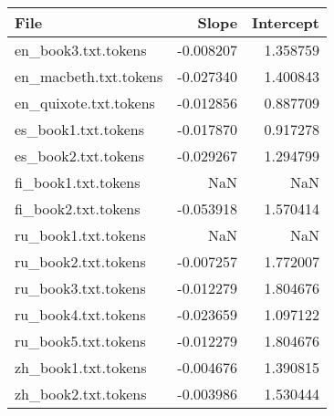 \begin{tabular}{lrr}
\toprule
File & Slope & Intercept \\
\midrule
en_book3.txt.tokens & -0.008207 & 1.358759 \\
en_macbeth.txt.tokens & -0.027340 & 1.400843 \\
en_quixote.txt.tokens & -0.012856 & 0.887709 \\
es_book1.txt.tokens & -0.017870 & 0.917278 \\
es_book2.txt.tokens & -0.029267 & 1.294799 \\
fi_book1.txt.tokens & NaN & NaN \\
fi_book2.txt.tokens & -0.053918 & 1.570414 \\
ru_book1.txt.tokens & NaN & NaN \\
ru_book2.txt.tokens & -0.007257 & 1.772007 \\
ru_book3.txt.tokens & -0.012279 & 1.804676 \\
ru_book4.txt.tokens & -0.023659 & 1.097122 \\
ru_book5.txt.tokens & -0.012279 & 1.804676 \\
zh_book1.txt.tokens & -0.004676 & 1.390815 \\
zh_book2.txt.tokens & -0.003986 & 1.530444 \\
\bottomrule
\end{tabular}
